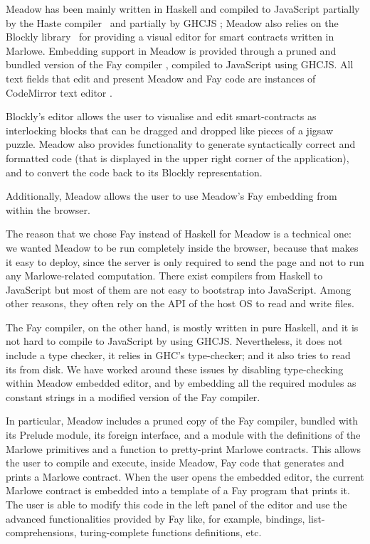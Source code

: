 \documentclass[runningheads]{llncs}
\begin{document}
Meadow has been mainly written in Haskell and compiled to JavaScript
partially by the Haste compiler~\cite{Haste} and partially by GHCJS \cite{GHCJS};
Meadow also relies on the Blockly library~\cite{Blockly} for providing a visual
editor for smart contracts written in Marlowe. Embedding support in Meadow
is provided through a pruned and bundled version of the Fay compiler \cite{Fay},
compiled to JavaScript using GHCJS. All text fields that edit and present Meadow and Fay code are
instances of CodeMirror text editor \cite{CodeMirror}.

Blockly's editor allows the user to visualise and edit
smart-contracts as interlocking blocks that can be dragged and dropped
like pieces of a jigsaw puzzle. %
Meadow also provides functionality to generate syntactically correct
and formatted code (that is displayed in the upper right corner of the application),
and to convert the code back to its Blockly representation.

Additionally, Meadow allows the user to use Meadow's Fay embedding from within the browser. %

The reason that we chose Fay instead of Haskell for Meadow is a technical one: we wanted Meadow to be run completely inside 
the browser, because that makes it easy to deploy, since the server is only required to send the page and not to 
run any Marlowe-related computation. There exist compilers from Haskell to JavaScript but most of them are not easy to 
bootstrap into JavaScript. Among other reasons, they often rely on the API of the host OS to read and write files.

The Fay compiler, on the other hand, is mostly written in pure Haskell, and it is not hard to compile to JavaScript by 
using GHCJS. Nevertheless, it does not include a type checker, it relies in GHC's type-checker; and it also 
tries to read its  from disk. We have worked around these issues by disabling type-checking 
within Meadow embedded editor, and by embedding all the required modules as constant strings in a modified version 
of the Fay compiler.

In particular, Meadow includes a pruned copy of the Fay compiler, bundled with its Prelude module, its foreign 
interface, and a module with the definitions of the Marlowe primitives and a function to pretty-print 
Marlowe contracts. This allows the user to compile and execute, inside Meadow, Fay code that generates and prints 
a Marlowe contract. When the user opens the embedded editor, the current Marlowe contract is embedded into a template 
of a Fay program that prints it. The user is able to modify this code in the left panel of the editor and use the 
advanced functionalities provided by Fay like, for example, bindings, list-comprehensions, turing-complete functions 
definitions, etc.
\end{document}
